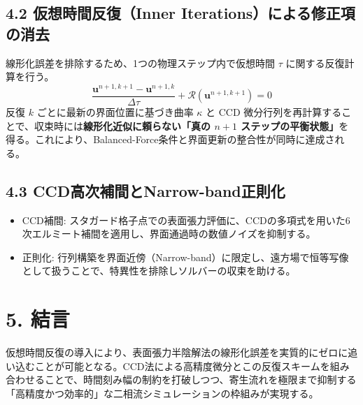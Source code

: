 \documentclass[12pt, a4paper, titlepage]{article}
\begin{document}
\subsection*{4.2 仮想時間反復（Inner Iterations）による修正項の消去}
線形化誤差を排除するため、1つの物理ステップ内で仮想時間 $\tau$ に関する反復計算を行う。$$\frac{\mathbf{u}^{n+1, k+1} - \mathbf{u}^{n+1, k}}{\Delta \tau} + \mathcal{R}(\mathbf{u}^{n+1, k+1}) = 0$$
反復 $k$ ごとに最新の界面位置に基づき曲率 $\kappa$ と CCD 微分行列を再計算することで、収束時には\textbf{線形化近似に頼らない「真の $n+1$ ステップの平衡状態」}を得る。これにより、Balanced-Force条件と界面更新の整合性が同時に達成される。

\subsection*{4.3 CCD高次補間とNarrow-band正則化}
\begin{itemize}
    \item CCD補間: スタガード格子点での表面張力評価に、CCDの多項式を用いた6次エルミート補間を適用し、界面通過時の数値ノイズを抑制する。
    \item 正則化: 行列構築を界面近傍（Narrow-band）に限定し、遠方場で恒等写像として扱うことで、特異性を排除しソルバーの収束を助ける。
\end{itemize}

\section*{5. 結言}
仮想時間反復の導入により、表面張力半陰解法の線形化誤差を実質的にゼロに追い込むことが可能となる。CCD法による高精度微分とこの反復スキームを組み合わせることで、時間刻み幅の制約を打破しつつ、寄生流れを極限まで抑制する「高精度かつ効率的」な二相流シミュレーションの枠組みが実現する。
\end{document}
